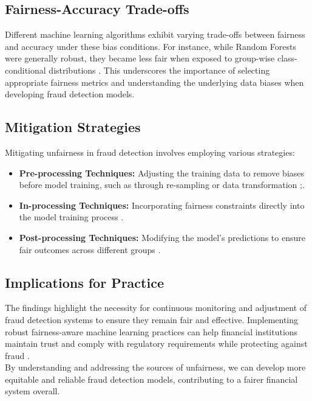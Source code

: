 \documentclass[12pt,a4paper]{report}
\begin{document}
\subsection{Fairness-Accuracy Trade-offs}
Different machine learning algorithms exhibit varying trade-offs between fairness and accuracy under these bias conditions. For instance, while Random Forests were generally robust, they became less fair when exposed to group-wise class-conditional distributions \citep{pombal2022understanding}. This underscores the importance of selecting appropriate fairness metrics and understanding the underlying data biases when developing fraud detection models.

\subsection{Mitigation Strategies}
Mitigating unfairness in fraud detection involves employing various strategies:
\begin{itemize}
    \item \textbf{Pre-processing Techniques:} Adjusting the training data to remove biases before model training, such as through re-sampling or data transformation \citep{kamiran2012data};\citep{caton2024fairness}.
    \item \textbf{In-processing Techniques:} Incorporating fairness constraints directly into the model training process \citep{caton2024fairness}.
    \item \textbf{Post-processing Techniques:} Modifying the model's predictions to ensure fair outcomes across different groups \citep{hardt2016equality}.
\end{itemize}

\subsection{Implications for Practice}
The findings highlight the necessity for continuous monitoring and adjustment of fraud detection systems to ensure they remain fair and effective. Implementing robust fairness-aware machine learning practices can help financial institutions maintain trust and comply with regulatory requirements while protecting against fraud \citep{pombal2022understanding}.\\

By understanding and addressing the sources of unfairness, we can develop more equitable and reliable fraud detection models, contributing to a fairer financial system overall.
\end{document}

